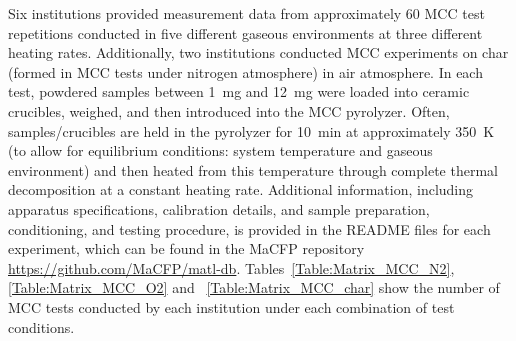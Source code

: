 \documentclass{book}
\begin{document}
Six institutions provided measurement data from approximately 60 MCC test repetitions conducted in five different gaseous environments at three different heating rates. Additionally, two institutions conducted MCC experiments on char (formed in MCC tests under nitrogen atmosphere) in air atmosphere. In each test, powdered samples between 1~mg and 12~mg were loaded into ceramic crucibles, weighed, and then introduced into the MCC pyrolyzer. Often, samples/crucibles are held in the pyrolyzer for 10~min at approximately 350~K (to allow for equilibrium conditions: system temperature and gaseous environment) and then heated from this temperature through complete thermal decomposition at a constant heating rate. Additional information, including  apparatus specifications, calibration details, and sample preparation, conditioning, and testing procedure, is provided in the README files for each experiment, which can be found in the MaCFP repository \href{https://github.com/MaCFP/matl-db}{https://github.com/MaCFP/matl-db}. Tables~\ref{Table:Matrix_MCC_N2}, \ref{Table:Matrix_MCC_O2}  and ~\ref{Table:Matrix_MCC_char} show the number of MCC tests conducted by each institution under each combination of test conditions.


\begin{table}[ht]
	\caption{Test Matrix of MCC Tests conducted in Nitrogen; table values indicate number of tests conducted under listed test conditions}
	\label{Table:Matrix_MCC_N2}
	\begin{center}
		\\
	\end{center}
\end{table}

\begin{table}[ht]
	\caption{Test Matrix of MCC Tests conducted in different atmosphere at a heating rate of 60~K/min; table values indicate number of tests conducted under listed test conditions}
	\label{Table:Matrix_MCC_O2}
	\begin{center}
		\\
	\end{center}
\end{table}

\begin{table}[ht]
	\caption{Test Matrix of MCC Tests conducted on char in 20 Vol\% oxygen at a heating rate of 60~K/min; table values indicate number of tests conducted under listed test conditions}
	\label{Table:Matrix_MCC_char}
	\begin{center}
		\\
	\end{center}
\end{table}
\end{document}
